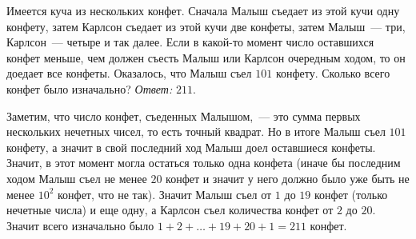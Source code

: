\problem
Имеется куча из нескольких конфет.
Сначала Малыш съедает из этой кучи одну конфету, затем Карлсон съедает из этой
кучи две конфеты, затем Малыш~--- три, Карлсон~--- четыре и так далее.
Если в какой-то момент число оставшихся конфет меньше, чем должен съесть Малыш
или Карлсон очередным ходом, то он доедает все конфеты.
Оказалось, что Малыш съел $101$ конфету.
Сколько всего конфет было изначально?
\solution
\emph{Ответ:} $211$.
\par
Заметим, что число конфет, съеденных Малышом,~--- это сумма первых нескольких
нечетных чисел, то есть точный квадрат.
Но в итоге Малыш съел $101$ конфету, а значит в свой последний ход Малыш доел
оставшиеся конфеты.
Значит, в этот момент могла остаться только одна конфета
(иначе бы последним ходом Малыш съел не менее $20$ конфет и значит у него
должно было уже быть не менее $10^2$ конфет, что не так).
Значит Малыш съел от $1$ до $19$ конфет (только нечетные числа) и еще одну, а
Карлсон съел количества конфет от $2$ до $20$.
Значит всего изначально было $1 + 2 + \ldots + 19 + 20 + 1 = 211$ конфет.
\endproblem
